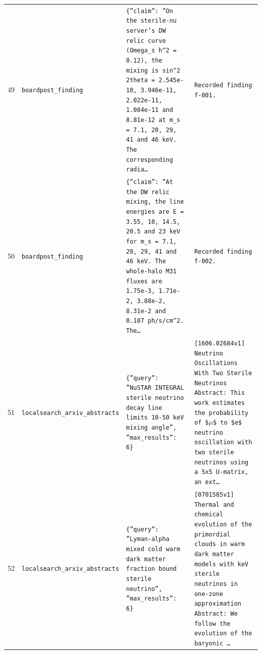 \documentclass[11pt,a4paper]{article}
\begin{document}
\begin{longtable}{@{}p{}p{}p{}p{}@{}}
49 & \texttt{board}\newline\texttt{post\_\allowbreak{}finding} & \texttt{\{''claim'':\allowbreak{} ''On the sterile-nu server's DW relic curve (Omega\_\allowbreak{}s h\textasciicircum{}\allowbreak{}2 =\allowbreak{} 0.12)\allowbreak{},\allowbreak{} the mixing is sin\textasciicircum{}\allowbreak{}2 2theta =\allowbreak{} 2.545e-10,\allowbreak{} 3.946e-11,\allowbreak{} 2.022e-11,\allowbreak{} 1.084e-11 and 8.81e-12 at m\_\allowbreak{}s =\allowbreak{} 7.1,\allowbreak{} 20,\allowbreak{} 29,\allowbreak{} 41 and 46 keV. The corresponding radia\ldots{}\allowbreak{}} & \texttt{Recorded finding f-001.} \\
50 & \texttt{board}\newline\texttt{post\_\allowbreak{}finding} & \texttt{\{''claim'':\allowbreak{} ''At the DW relic mixing,\allowbreak{} the line energies are E =\allowbreak{} 3.55,\allowbreak{} 10,\allowbreak{} 14.5,\allowbreak{} 20.5 and 23 keV for m\_\allowbreak{}s =\allowbreak{} 7.1,\allowbreak{} 20,\allowbreak{} 29,\allowbreak{} 41 and 46 keV. The whole-halo M31 fluxes are 1.75e-3,\allowbreak{} 1.71e-2,\allowbreak{} 3.88e-2,\allowbreak{} 8.31e-2 and 0.107 ph/\allowbreak{}s/\allowbreak{}cm\textasciicircum{}\allowbreak{}2. The\ldots{}\allowbreak{}} & \texttt{Recorded finding f-002.} \\
51 & \texttt{local}\newline\texttt{search\_\allowbreak{}arxiv\_\allowbreak{}abstracts} & \texttt{\{''query'':\allowbreak{} ''NuSTAR INTEGRAL sterile neutrino decay line limits 10-50 keV mixing angle'',\allowbreak{} ''max\_\allowbreak{}results'':\allowbreak{} 6\}\allowbreak{}} & \texttt{[1606.02684v1]\allowbreak{} Neutrino Oscillations With Two Sterile Neutrinos Abstract:\allowbreak{} This work estimates the probability of \$$\mu$\$ to \$e\$ neutrino oscillation with two sterile neutrinos using a 5x5 U-matrix,\allowbreak{} an ext\ldots{}\allowbreak{}} \\
52 & \texttt{local}\newline\texttt{search\_\allowbreak{}arxiv\_\allowbreak{}abstracts} & \texttt{\{''query'':\allowbreak{} ''Lyman-alpha mixed cold warm dark matter fraction bound sterile neutrino'',\allowbreak{} ''max\_\allowbreak{}results'':\allowbreak{} 6\}\allowbreak{}} & \texttt{[0701585v1]\allowbreak{} Thermal and chemical evolution of the primordial clouds in warm dark matter models with keV sterile neutrinos in one-zone approximation Abstract:\allowbreak{}   We follow the evolution of the baryonic \ldots{}\allowbreak{}} \\

\end{longtable}
\end{document}
